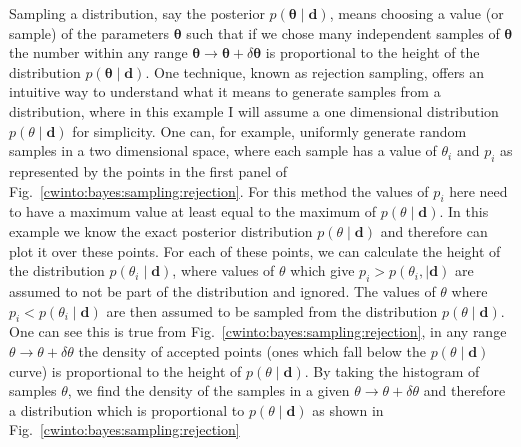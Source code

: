Sampling a distribution, say the posterior $p(\bm{\theta} \mid \bm{d})$, means
choosing a value (or sample) of the parameters $\bm{\theta}$ such that if we
chose many independent samples of $\bm{\theta}$ the number within any range
$\bm{\theta} \rightarrow \bm{\theta} + \delta \bm{\theta}$ is proportional to
the height of the distribution $p(\bm{\theta} \mid \bm{d})$.  One technique,
known as rejection sampling, offers an intuitive way to understand what it
means to generate samples from a distribution, where in this example I will
assume a one dimensional distribution $p(\theta \mid \bm{d})$ for simplicity.
One can, for example, uniformly generate random samples in a two dimensional
space, where each sample has a value of $\theta_i$ and $p_i$
as represented by the points in
the first panel of Fig.~\ref{cwinto:bayes:sampling:rejection}. For this method the values of $p_i$ here need to have a maximum value at least equal to the maximum of $p(\theta \mid \bm{d})$. In this example
we know the exact posterior distribution $p(\theta \mid \bm{d})$ and therefore
can plot it over these points.  For each of these points, we can calculate the
height of the distribution $p(\theta_i \mid \bm{d})$, where values of $\theta$
which give $p_i > p(\theta_i, \mid \bm{d})$ are assumed to not be part of the
distribution and ignored. The values of $\theta$ where $p_i < p(\theta_i \mid
\bm{d})$ are then assumed to be sampled from the distribution $p(\theta \mid \bm{d})$.  One
can see this is true from Fig.~\ref{cwinto:bayes:sampling:rejection}, in any
range $\theta \rightarrow \theta + \delta \theta$ the density of accepted
points (ones which fall below the $p(\theta \mid \bm{d})$ curve) is
proportional to the height of $p(\theta \mid \bm{d})$.  By taking the histogram
of samples $\theta$, we find the density of the samples in a given $\theta
\rightarrow \theta + \delta \theta$ and therefore a distribution which is
proportional to $p(\theta \mid \bm{d})$ as shown in
Fig.~\ref{cwinto:bayes:sampling:rejection} 

